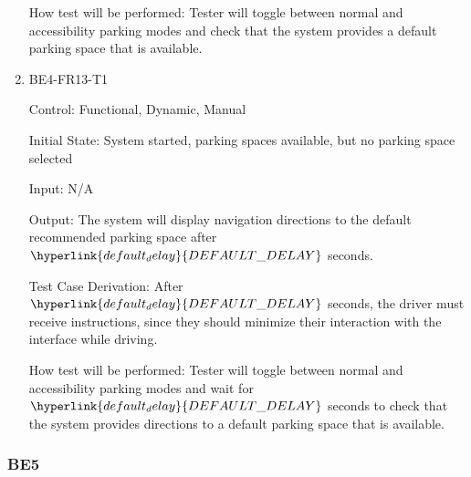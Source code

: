 \documentclass[12pt, titlepage]{article}
\begin{document}
\begin{enumerate}
How test will be performed: Tester will toggle between normal and accessibility
parking modes and check that the system provides a default parking space that is
available.

\item{BE4-FR13-T1}

Control: Functional, Dynamic, Manual
					
Initial State: System started, parking spaces available, but no parking space
selected
					
Input: N/A
					
Output: The system will display navigation directions to the default recommended
parking space after $\hyperlink{default_delay}{DEFAULT\_DELAY}$ seconds.

Test Case Derivation: After $\hyperlink{default_delay}{DEFAULT\_DELAY}$ seconds,
the driver must receive instructions, since they should minimize their
interaction with the interface while driving.
					
How test will be performed: Tester will toggle between normal and accessibility
parking modes and wait for $\hyperlink{default_delay}{DEFAULT\_DELAY}$ seconds
to check that the system provides directions to a default parking space that is
available.

\end{enumerate}

\subsubsection{BE5}
\end{document}
